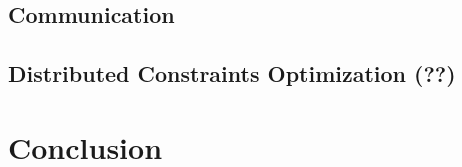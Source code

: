 \subsection{Communication}
\subsection{Distributed Constraints Optimization (??)}

\section{Conclusion}
